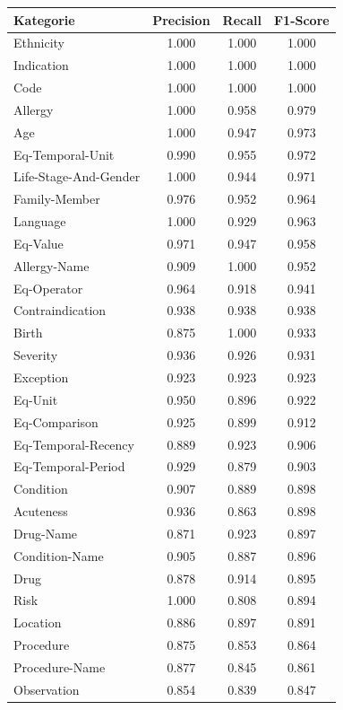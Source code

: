 \begin{table}[htbp]
\centering
\begin{tabular}{p{5cm}ccc}
\toprule
\textbf{Kategorie} & \textbf{Precision} & \textbf{Recall} & \textbf{F1-Score} \\
\midrule
Ethnicity & 1.000 & 1.000 & 1.000 \\
Indication & 1.000 & 1.000 & 1.000 \\
Code & 1.000 & 1.000 & 1.000 \\
Allergy & 1.000 & 0.958 & 0.979 \\
Age & 1.000 & 0.947 & 0.973 \\
Eq-Temporal-Unit & 0.990 & 0.955 & 0.972 \\
Life-Stage-And-Gender & 1.000 & 0.944 & 0.971 \\
Family-Member & 0.976 & 0.952 & 0.964 \\
Language & 1.000 & 0.929 & 0.963 \\
Eq-Value & 0.971 & 0.947 & 0.958 \\
Allergy-Name & 0.909 & 1.000 & 0.952 \\
Eq-Operator & 0.964 & 0.918 & 0.941 \\
Contraindication & 0.938 & 0.938 & 0.938 \\
Birth & 0.875 & 1.000 & 0.933 \\
Severity & 0.936 & 0.926 & 0.931 \\
Exception & 0.923 & 0.923 & 0.923 \\
Eq-Unit & 0.950 & 0.896 & 0.922 \\
Eq-Comparison & 0.925 & 0.899 & 0.912 \\
Eq-Temporal-Recency & 0.889 & 0.923 & 0.906 \\
Eq-Temporal-Period & 0.929 & 0.879 & 0.903 \\
Condition & 0.907 & 0.889 & 0.898 \\
Acuteness & 0.936 & 0.863 & 0.898 \\
Drug-Name & 0.871 & 0.923 & 0.897 \\
Condition-Name & 0.905 & 0.887 & 0.896 \\
Drug & 0.878 & 0.914 & 0.895 \\
Risk & 1.000 & 0.808 & 0.894 \\
Location & 0.886 & 0.897 & 0.891 \\
Procedure & 0.875 & 0.853 & 0.864 \\
Procedure-Name & 0.877 & 0.845 & 0.861 \\
Observation & 0.854 & 0.839 & 0.847 \\

\end{tabular}
\end{table}
